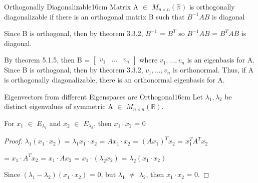    \begin{definition}{Orthogonally Diagonalizable}{16cm}
        Matrix A $\in$ $M_{n \times n}(\mathbb{R})$ is
        {\color{lblue} orthogonally diagonalizable} if there is
        an orthogonal matrix B such that $B^{-1}AB$ is diagonal

        Since B is orthogonal, then by {\color{red} theorem 3.3.2},
        $B^{-1}$ = $B^T$ so $B^{-1}AB$ = $B^TAB$ is diagonal.

        \vspace{0.3cm}

        By {\color{red} theorem 5.1.5}, then B =
        $\begin{bmatrix}
            v_1 & ... & v_n
        \end{bmatrix}$
        where $v_1,...,v_n$ is an eigenbasis for A.
        Since B is orthogonal, then by {\color{red} theorem 3.3.2},
        $v_1,...,v_n$ is orthonormal.
        Thus, if A is orthogonally diagonalizable,
        there is an orthonormal eigenbasis for A.
    \end{definition}

    \vspace{0.5cm}



    \begin{wtheorem}{Eigenvectors from different Eigenspaces are Orthogonal}{16cm}
        Let $\lambda_1,\lambda_2$ be distinct eigenvalues of
        symmetric A $\in$ $M_{n \times n}(\mathbb{R})$.

        For $x_1$ $\in$ $E_{\lambda_1}$ and $x_2$ $\in$ $E_{\lambda_2}$,
        then $x_1 \cdot x_2$ = 0
    \end{wtheorem}

    \begin{proof}
        $\lambda_1(x_1 \cdot x_2)$
        = $\lambda_1x_1 \cdot x_2$
        = $Ax_1 \cdot x_2$
        = $(Ax_1)^Tx_2$
        = $x_1^TA^Tx_2$

        \hspace{1.8cm}
        = $x_1 \cdot A^Tx_2$
        = $x_1 \cdot Ax_2$
        = $x_1 \cdot (\lambda_2x_2)$
        = $\lambda_2(x_1 \cdot x_2)$

        Since $(\lambda_1-\lambda_2)(x_1 \cdot x_2)$ = 0,
        but $\lambda_1$ $\not =$ $\lambda_2$, then $x_1 \cdot x_2$ = 0.
    \end{proof}

    \vspace{0.5cm}



